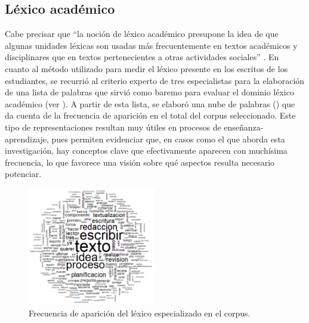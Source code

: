 \documentclass{textolivre}
\begin{document}
\subsection{Léxico académico}\label{sec-lex}
Cabe precisar que “la noción de léxico académico presupone la idea de
que algunas unidades léxicas son usadas más frecuentemente en textos académicos
y disciplinares que en textos pertenecientes a otras actividades sociales”
\cite[p. 251]{CisnerosEstupian2019}. En cuanto al método utilizado para medir el
léxico presente en los escritos de los estudiantes, se recurrió al criterio
experto de tres especialistas para la elaboración de una lista de palabras que
sirvió como baremo para evaluar el dominio léxico académico (ver ). A partir
de esta lista, se elaboró una nube de palabras () que da cuenta de la
frecuencia de aparición en el total del corpus seleccionado. Este tipo de
representaciones resultan muy útiles en procesos de enseñanza-aprendizaje,
pues permiten evidenciar que, en casos como el que aborda esta investigación,
hay conceptos clave que efectivamente aparecen con muchísima frecuencia, lo que
favorece una visión sobre qué aspectos resulta necesario potenciar.

\begin{figure}[htbp]
 \centering
 \includegraphics[width=0.5\textwidth]{figure01.pdf}
 \caption{Frecuencia de aparición del léxico especializado en el corpus.}
 \label{fig01}
\end{figure}
\end{document}
